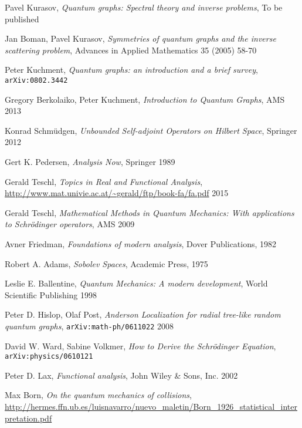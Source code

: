 \begin{thebibliography}{99}

  Pavel Kurasov,
  \textit{Quantum graphs: Spectral theory and inverse problems},
  To be published

  Jan Boman, Pavel Kurasov,
  \textit{Symmetries of quantum graphs and the inverse scattering problem},
  Advances in Applied Mathematics 35 (2005) 58-70

  Peter Kuchment,
  \textit{Quantum graphs: an introduction and a brief survey},
  \texttt{arXiv:0802.3442}

  Gregory Berkolaiko, Peter Kuchment,
  \textit{Introduction to Quantum Graphs},
  AMS 2013

  Konrad Schmüdgen,
  \textit{Unbounded Self-adjoint Operators on Hilbert Space},
  Springer 2012

  Gert K. Pedersen,
  \textit{Analysis Now},
  Springer 1989

  Gerald Teschl,
  \textit{Topics in Real and Functional Analysis},
  \url{http://www.mat.univie.ac.at/~gerald/ftp/book-fa/fa.pdf} 2015

  Gerald Teschl,
  \textit{Mathematical Methods in Quantum Mechanics: With applications to Schrödinger operators},
  AMS 2009

  Avner Friedman,
  \textit{Foundations of modern analysis},
  Dover Publications, 1982

  Robert A. Adams,
  \textit{Sobolev Spaces},
  Academic Press, 1975

  Leslie E. Ballentine,
  \textit{Quantum Mechanics: A modern development},
  World Scientific Publishing 1998

  \bibitem{}
  Peter D. Hislop, Olaf Post,
  \textit{Anderson Localization for radial tree-like random quantum graphs},
  \texttt{arXiv:math-ph/0611022} 2008

  David W. Ward, Sabine Volkmer,
  \textit{How to Derive the Schrödinger Equation},
  \texttt{arXiv:physics/0610121}

  Peter D. Lax,
  \textit{Functional analysis},
  John Wiley \& Sons, Inc. 2002

  Max Born,
  \textit{On the quantum mechanics of collisions},
  \url{http://hermes.ffn.ub.es/luisnavarro/nuevo_maletin/Born_1926_statistical_interpretation.pdf}


\end{thebibliography}
